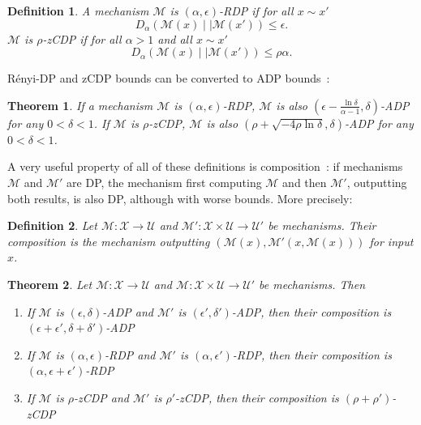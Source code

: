 \documentclass[english,twoside,openright]{HYgraduMLDS}
\newtheorem{theorem}{Theorem}
\newtheorem{definition}{Definition}
\newcommand{\dmid}{\mid\mid}
\newcommand{\calm}{{\mathcal{M}}}
\newcommand{\calx}{{\mathcal{X}}}
\newcommand{\calu}{{\mathcal{U}}}
\begin{document}
\begin{definition}
    A mechanism \(\calm\) is \((\alpha, \epsilon)\)-RDP
    if for all \(x \sim x'\)
    \[
        D_\alpha(\calm(x)\dmid \calm(x')) \leq \epsilon.
    \]
    \(\calm\) is \(\rho\)-zCDP if for all \(\alpha > 1\)
    and all \(x \sim x'\)
    \[
        D_\alpha(\calm(x)\dmid \calm(x')) \leq \rho \alpha.
    \]

\end{definition}

Rényi-DP and zCDP bounds can be converted to ADP bounds~\cite{Mironov17, BuS16}:
\begin{theorem}\label{other_dp_to_adp}
    If a mechanism \(\calm\) is \((\alpha, \epsilon)\)-RDP, \(\calm\) is also
    \((\epsilon - \frac{\ln \delta}{\alpha - 1}, \delta)\)-ADP for any 
    \(0 < \delta < 1\). If \(\calm\) is \(\rho\)-zCDP, \(\calm\) is also 
    \((\rho + \sqrt{-4\rho\ln \delta}, \delta)\)-ADP for any \(0 < \delta < 1\).
\end{theorem}

A very useful property of all of these definitions is composition~\cite{DwR14}: 
if mechanisms \(\calm\) and \(\calm'\) are DP, the mechanism first computing
\(\calm\) and then \(\calm'\), outputting both results, 
is also DP, although with worse bounds.
More precisely:

\begin{definition}\label{composition_definition}
    Let \(\calm\colon \calx \to \calu\) and 
    \(\calm'\colon \calx\times \calu \to \calu'\) be mechanisms.
    Their composition is the mechanism outputting
    \((\calm(x), \calm'(x, \calm(x)))\) for input \(x\).
\end{definition}

\begin{theorem}\label{composition-theorem}
    Let \(\calm\colon \calx \to \calu\) and 
    \(\calm\colon \calx\times \calu \to \calu'\) be mechanisms. Then
    \begin{enumerate}
        \item 
            If \(\calm\) is \((\epsilon, \delta)\)-ADP and 
            \(\calm'\) is \((\epsilon', \delta')\)-ADP, then 
            their composition is 
            \((\epsilon + \epsilon', \delta + \delta')\)-ADP~\cite{DKM06}
        \item 
            If \(\calm\) is \((\alpha, \epsilon)\)-RDP and 
            \(\calm'\) is \((\alpha, \epsilon')\)-RDP, then 
            their composition is \((\alpha, \epsilon + \epsilon')\)-RDP~\cite{Mironov17}
        \item 
            If \(\calm\) is \(\rho\)-zCDP and 
            \(\calm'\) is \(\rho'\)-zCDP, then 
            their composition is \((\rho + \rho')\)-zCDP~\cite{BuS16}
    \end{enumerate}
\end{theorem}
\end{document}
